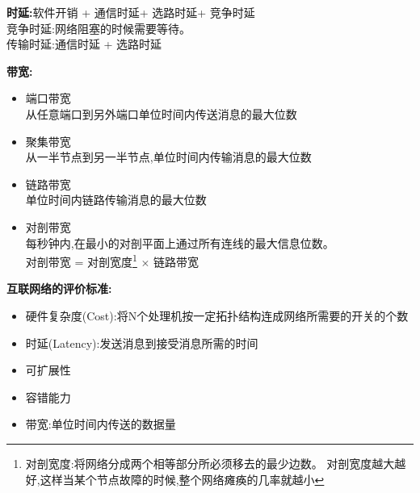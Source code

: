 \documentclass[UTF8,a4paper]{ctexart}
\newcommand{\spaceline}{\vspace{\baselineskip}}
\begin{document}
  \spaceline
  \textbf{时延:}软件开销 + 通信时延+ 选路时延+ 竞争时延\\
  竞争时延:网络阻塞的时候需要等待。\\
  传输时延:通信时延 + 选路时延

  \spaceline
  \textbf{带宽:}
  \begin{itemize}
    \item 端口带宽\\
    从任意端口到另外端口单位时间内传送消息的最大位数
    \item 聚集带宽\\
    从一半节点到另一半节点,单位时间内传输消息的最大位数
    \item 链路带宽\\
    单位时间内链路传输消息的最大位数
    \item 对剖带宽\\
    每秒钟内,在最小的对剖平面上通过所有连线的最大信息位数。\\
    对剖带宽 = 对剖宽度\footnote{对剖宽度:将网络分成两个相等部分所必须移去的最少边数。
    对剖宽度越大越好,这样当某个节点故障的时候,整个网络瘫痪的几率就越小} $\times$ 链路带宽
  \end{itemize}

  \spaceline
  \textbf{互联网络的评价标准:}
  \begin{itemize}
    \item 硬件复杂度(Cost):将N个处理机按一定拓扑结构连成网络所需要的开关的个数
    \item 时延(Latency):发送消息到接受消息所需的时间
    \item 可扩展性
    \item 容错能力
    \item 带宽:单位时间内传送的数据量
  \end{itemize}
\end{document}
